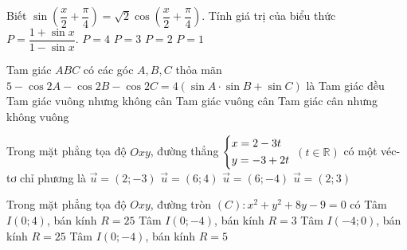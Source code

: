 \begin{ex}%
Biết $\sin \left ( \dfrac{x}{2} + \dfrac{\pi}{4}\right ) = \sqrt{2} \cos \left ( \dfrac{x}{2} + \dfrac{\pi}{4}\right )$. Tính giá trị của biểu thức $P=\dfrac{1+\sin x}{1-\sin x}$. 
\choice
{$P=4$}
{$P=3$}
{\True $P=2$}
{$P=1$}
\end{ex}


\begin{ex}%
Tam giác $ABC$ có các góc $A,B,C$ thỏa mãn $5-\cos 2A -\cos 2B - \cos 2C=4(\sin A \cdot \sin B+ \sin C)$ là
\choice
{Tam giác đều}
{Tam giác vuông nhưng không cân}
{\True Tam giác vuông cân}
{Tam giác cân nhưng không vuông}
\end{ex}


\begin{ex}%
Trong mặt phẳng tọa độ $Oxy$, đường thẳng $\left\{\begin{aligned}&x=2-3t\\&y=-3+2t\end{aligned}\right.$ $(t \in \mathbb{R})$ có một véc-tơ chỉ phương là
\choice
{$\overrightarrow{u} = (2;-3)$}
{$\overrightarrow{u} = (6;4)$}
{\True $\overrightarrow{u} = (6;-4)$}
{$\overrightarrow{u} = (2;3)$}
\end{ex}

\begin{ex}%
Trong mặt phẳng tọa độ $Oxy$, đường tròn $(C) : x^2+y^2+8y-9=0$ có
\choice
{Tâm $I(0;4)$, bán kính $R=25$}
{Tâm $I(0;-4)$, bán kính $R=3$}
{Tâm $I(-4;0)$, bán kính $R=25$}
{\True Tâm $I(0;-4)$, bán kính $R=5$}
\end{ex}

